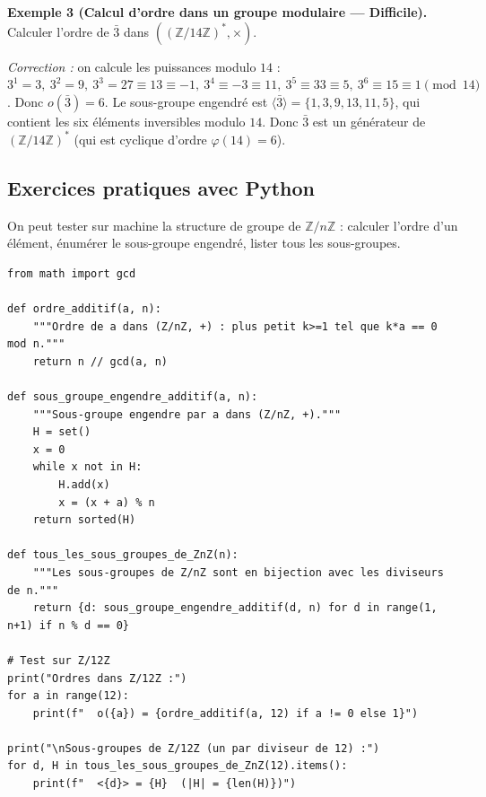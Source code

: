 \medskip

\textbf{Exemple 3 (Calcul d'ordre dans un groupe modulaire --- Difficile).}
Calculer l'ordre de $\bar{3}$ dans $((\mathbb{Z}/14\mathbb{Z})^*, \times)$.

\textit{Correction :} on calcule les puissances modulo $14$ :
$3^1 = 3,\ 3^2 = 9,\ 3^3 = 27 \equiv 13 \equiv -1,\ 3^4 \equiv -3 \equiv 11,\ 3^5 \equiv 33 \equiv 5,\ 3^6 \equiv 15 \equiv 1 \pmod{14}$.
Donc $o(\bar{3}) = 6$. Le sous-groupe engendré est $\langle \bar{3} \rangle = \{1, 3, 9, 13, 11, 5\}$, qui contient les six éléments inversibles modulo $14$. Donc $\bar{3}$ est un générateur de $(\mathbb{Z}/14\mathbb{Z})^*$ (qui est cyclique d'ordre $\varphi(14) = 6$).

\subsection{Exercices pratiques avec Python}
On peut tester sur machine la structure de groupe de $\mathbb{Z}/n\mathbb{Z}$ : calculer l'ordre d'un élément, énumérer le sous-groupe engendré, lister tous les sous-groupes.

\begin{lstlisting}
from math import gcd

def ordre_additif(a, n):
    """Ordre de a dans (Z/nZ, +) : plus petit k>=1 tel que k*a == 0 mod n."""
    return n // gcd(a, n)

def sous_groupe_engendre_additif(a, n):
    """Sous-groupe engendre par a dans (Z/nZ, +)."""
    H = set()
    x = 0
    while x not in H:
        H.add(x)
        x = (x + a) % n
    return sorted(H)

def tous_les_sous_groupes_de_ZnZ(n):
    """Les sous-groupes de Z/nZ sont en bijection avec les diviseurs de n."""
    return {d: sous_groupe_engendre_additif(d, n) for d in range(1, n+1) if n % d == 0}

# Test sur Z/12Z
print("Ordres dans Z/12Z :")
for a in range(12):
    print(f"  o({a}) = {ordre_additif(a, 12) if a != 0 else 1}")

print("\nSous-groupes de Z/12Z (un par diviseur de 12) :")
for d, H in tous_les_sous_groupes_de_ZnZ(12).items():
    print(f"  <{d}> = {H}  (|H| = {len(H)})")
\end{lstlisting}

